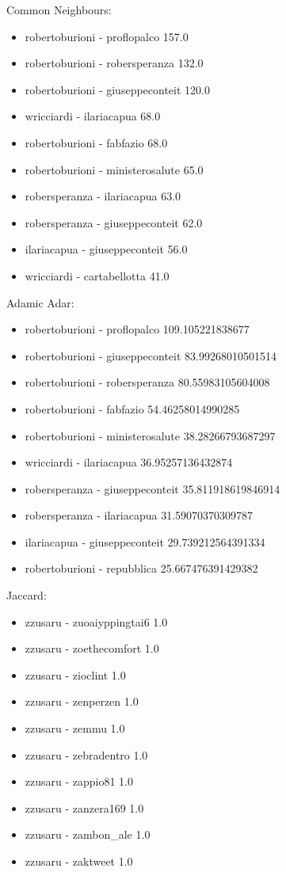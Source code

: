 \documentclass[sigchi]{acmart}
\begin{document}
Common Neighbours:
\begin{itemize}
    \item robertoburioni - proflopalco 157.0
\item robertoburioni - robersperanza 132.0
\item robertoburioni - giuseppeconteit 120.0
\item wricciardi - ilariacapua 68.0
\item robertoburioni - fabfazio 68.0
\item robertoburioni - ministerosalute 65.0
\item robersperanza - ilariacapua 63.0
\item robersperanza - giuseppeconteit 62.0
\item ilariacapua - giuseppeconteit 56.0
\item wricciardi - cartabellotta 41.0
\end{itemize}
Adamic Adar:
\begin{itemize}
    \item robertoburioni - proflopalco 109.105221838677
\item robertoburioni - giuseppeconteit 83.99268010501514
\item robertoburioni - robersperanza 80.55983105604008
\item robertoburioni - fabfazio 54.46258014990285
\item robertoburioni - ministerosalute 38.28266793687297
\item wricciardi - ilariacapua 36.95257136432874
\item robersperanza - giuseppeconteit 35.811918619846914
\item robersperanza - ilariacapua 31.59070370309787
\item ilariacapua - giuseppeconteit 29.739212564391334
\item robertoburioni - repubblica 25.667476391429382
\end{itemize}
Jaccard:
\begin{itemize}
    \item zzusaru - zuoaiyppingtai6 1.0
\item zzusaru - zoethecomfort 1.0
\item zzusaru - zioclint 1.0
\item zzusaru - zenperzen 1.0
\item zzusaru - zemmu 1.0
\item zzusaru - zebradentro 1.0
\item zzusaru - zappio81 1.0
\item zzusaru - zanzera169 1.0
\item zzusaru - zambon\_ale 1.0
\item zzusaru - zaktweet 1.0
\end{itemize}
\end{document}
